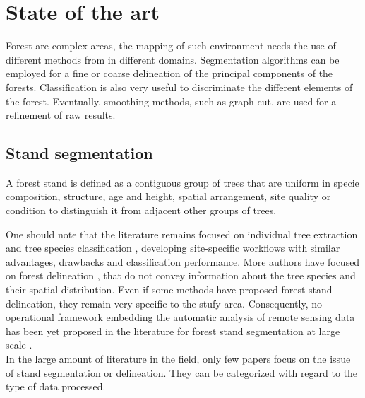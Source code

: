 \chapter{State of the art} %
\label{Chapter1} %

\startcontents[chapters]
\Mprintcontents





Forest are complex areas, the mapping of such environment needs the use of different methods from in different domains. Segmentation algorithms can be employed for a fine or coarse delineation of the principal components of the forests. Classification is also very useful to discriminate the different elements of the forest. Eventually, smoothing methods, such as graph cut, are used for a refinement of raw results.

\section{Stand segmentation}
A forest stand is defined as a contiguous group of trees that are uniform in specie composition, structure, age and height, spatial arrangement, site quality or condition to distinguish it from adjacent other groups of trees.

One should note that the literature remains focused on individual tree extraction and tree species classification \citep{dalponte2014tree, vega2014ptrees, kandare2014new, }, developing site-specific workflows with similar advantages, drawbacks and classification performance. More authors have focused on forest delineation \citep{eysn2012forest}, that do not convey information about the tree species and their spatial distribution. Even if some methods have proposed forest stand delineation, they remain very specific to the stufy area. Consequently, no operational framework embedding the automatic analysis of remote sensing data has been yet proposed in the literature for forest stand segmentation at large scale \citep{clement_IJPRS}. \\

In the large amount of literature in the field, only few papers focus on the issue of stand segmentation or delineation. They can be categorized with regard to the type of data processed. \\
